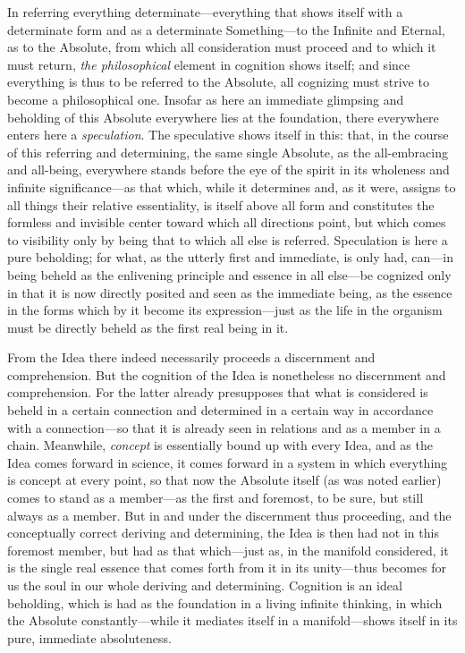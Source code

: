 \documentclass[12pt,a4paper]{book}
\begin{document}
In referring everything determinate---everything that shows itself with a determinate
form and as a determinate Something---to the Infinite and Eternal, as to the Absolute,
from which all consideration must proceed and to which it must return, \emph{the
philosophical} element in cognition shows itself; and since everything is thus to
be referred to the Absolute, all cognizing must strive to become a philosophical one.
Insofar as here an immediate glimpsing and beholding of this Absolute everywhere lies
at the foundation, there everywhere enters here a \emph{speculation}. The speculative
shows itself in this: that, in the course of this referring and determining, the same
single Absolute, as the all-embracing and all-being, everywhere stands before the eye
of the spirit in its wholeness and infinite significance---as that which, while it
determines and, as it were, assigns to all things their relative essentiality, is
itself above all form and constitutes the formless and invisible center toward which
all directions point, but which comes to visibility only by being that to which all
else is referred. Speculation is here a pure beholding; for what, as the utterly first
and immediate, is only had, can---in being beheld as the enlivening principle and essence in
all else---be cognized only in that it is now directly posited and seen as the
immediate being, as the essence in the forms which by it become its expression---just
as the life in the organism must be directly beheld as the first real being in it.

From the Idea there indeed necessarily proceeds a discernment and comprehension. But
the cognition of the Idea is nonetheless no discernment and comprehension. For the
latter already presupposes that what is considered is beheld in a certain connection
and determined in a certain way in accordance with a connection---so that it is already
seen in relations and as a member in a chain. Meanwhile, \emph{concept} is essentially bound
up with every Idea, and as the Idea comes forward in science, it comes forward in a
system in which everything is concept at every point, so that now the Absolute itself
(as was noted earlier) comes to stand as a member---as the first and foremost, to be
sure, but still always as a member. But in and under the discernment thus proceeding,
and the conceptually correct deriving and determining, the Idea is then had not in this
foremost member, but had as that which---just as, in the manifold considered, it is the
single real essence that comes forth from it in its unity---thus becomes for us the
soul in our whole deriving and determining. Cognition is an ideal beholding, which is
had as the foundation in a living infinite thinking, in which the Absolute
constantly---while it mediates itself in a manifold---shows itself in its pure,
immediate absoluteness.
\end{document}
